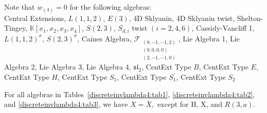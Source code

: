 \documentclass{amsart}
\begin{document}


\begin{remark}
Note that \( w_{(4)} = 0 \) for the following algebras: \\
    Central Extensions, $L(1,1,2)$, $E(3)$, 4D Sklyanin, 4D Sklyanin twist, Shelton-Tingey, $\mathbb{K}[x_1,x_2,x_3,x_4]$, $S(2,3)$, $S_{d,i}$ twist $(i = 2, 4, 6)$, Cassidy-Vancliff 1, $L(1,1,2)^{\sigma}$, $S(2,3)^{\sigma}$, Caines Algebra, 
    \(\mathcal{F}_{\substack{(0,-1,-1,2)\\(0,0,0,0)\\(2,-1,-1,0)}}\), Lie Algebra 1, Lie Algebra 2, Lie Algebra 3, Lie Algebra 4, $\mathfrak{sl_2}$, CentExt Type $B$, CentExt Type $E$, CentExt Type $H$, CentExt Type $S_1$, CentExt Type $S_1^{'}$, CentExt Type $S_2$
\end{remark}


\begin{remark}
For all algebras in Tables~\ref{discreteinvlambda4:tab1}, \ref{discreteinvlambda4:tab2}, and \ref{discreteinvlambda4:tab3}, we have 
$X = \bar{X},$ except for H, X, and \(R(3,a)\).
\end{remark}
\end{document}
